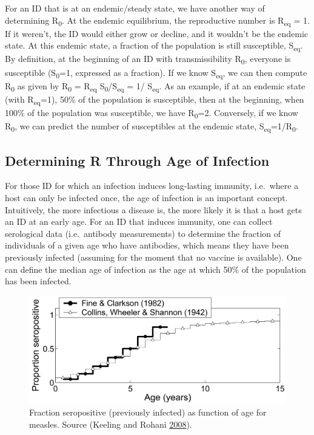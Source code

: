 \documentclass[]{article}
\theoremstyle{definition}
\theoremstyle{definition}
\theoremstyle{definition}
\theoremstyle{remark}
\begin{document}
For an ID that is at an endemic/steady state, we have another way of
determining R\textsubscript{0}. At the endemic equilibrium, the
reproductive number is R\textsubscript{eq} = 1. If it weren't, the ID
would either grow or decline, and it wouldn't be the endemic state. At
this endemic state, a fraction of the population is still susceptible,
S\textsubscript{eq}. By definition, at the beginning of an ID with
transmissibility R\textsubscript{0}, everyone is susceptible
(S\textsubscript{0}=1, expressed as a fraction). If we know
S\textsubscript{eq}, we can then compute R\textsubscript{0} as given by
R\textsubscript{0} = R\textsubscript{eq}
S\textsubscript{0}/S\textsubscript{eq} = 1/ S\textsubscript{eq}. As an
example, if at an endemic state (with R\textsubscript{eq}=1), 50\% of
the population is susceptible, then at the beginning, when 100\% of the
population was susceptible, we have R\textsubscript{0}=2. Conversely, if
we know R\textsubscript{0}, we can predict the number of susceptibles at
the endemic state, S\textsubscript{eq}=1/R\textsubscript{0}.

\subsection{Determining R Through Age of
Infection}\label{determining-r-through-age-of-infection}

For those ID for which an infection induces long-lasting immunity,
i.e.~where a host can only be infected once, the age of infection is an
important concept. Intuitively, the more infectious a disease is, the
more likely it is that a host gets an ID at an early age. For an ID that
induces immunity, one can collect serological data (i.e.~antibody
measurements) to determine the fraction of individuals of a given age
who have antibodies, which means they have been previously infected
(assuming for the moment that no vaccine is available). One can define
the median age of infection as the age at which 50\% of the population
has been infected.

\begin{figure}
\centering
\includegraphics{./images/R0age.png}
\caption{Fraction seropositive (previously infected) as function of age
for measles. Source (Keeling and Rohani
\protect\hyperlink{ref-keeling08}{2008}).}
\end{figure}
\end{document}

